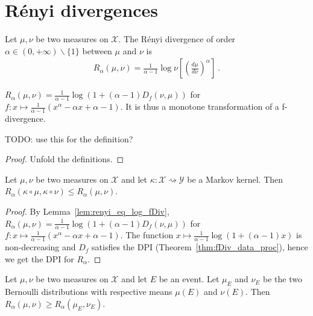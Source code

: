 \chapter{Rényi divergences}

\begin{definition}
  \label{def:Renyi}
  Let $\mu, \nu$ be two measures on $\mathcal X$. The Rényi divergence of order $\alpha \in (0,+\infty) \backslash \{1\}$ between $\mu$ and $\nu$ is
  \begin{align*}
  R_\alpha(\mu, \nu) = \frac{1}{\alpha - 1}\log \nu\left[\left(\frac{d \mu}{d \nu}\right)^\alpha\right] \: .
  \end{align*}
\end{definition}

\begin{lemma}
  \label{lem:renyi_eq_log_fDiv}
  $R_\alpha(\mu, \nu) = \frac{1}{\alpha - 1} \log (1 + (\alpha - 1) D_f(\nu, \mu))$ for $f : x \mapsto \frac{1}{\alpha - 1}(x^{\alpha} - \alpha x + \alpha - 1)$. It is thus a monotone transformation of a f-divergence.

  TODO: use this for the definition?
\end{lemma}

\begin{proof}
Unfold the definitions.
\end{proof}

\begin{theorem}
  \label{thm:renyi_data_proc}
  Let $\mu, \nu$ be two measures on $\mathcal X$ and let $\kappa : \mathcal X \rightsquigarrow \mathcal Y$ be a Markov kernel.
  Then $R_\alpha(\kappa \circ \mu, \kappa \circ \nu) \le R_\alpha(\mu, \nu)$.
\end{theorem}

\begin{proof}
By Lemma~\ref{lem:renyi_eq_log_fDiv}, $R_\alpha(\mu, \nu) = \frac{1}{\alpha - 1} \log (1 + (\alpha - 1) D_f(\nu, \mu))$ for $f : x \mapsto \frac{1}{\alpha - 1}(x^{\alpha} - \alpha x + \alpha - 1)$.
The function $x \mapsto \frac{1}{\alpha - 1}\log (1 + (\alpha - 1)x)$ is non-decreasing and $D_f$ satisfies the DPI (Theorem~\ref{thm:fDiv_data_proc}), hence we get the DPI for $R_\alpha$.
\end{proof}

\begin{lemma}
  \label{lem:renyi_data_proc_event}
  Let $\mu, \nu$ be two measures on $\mathcal X$ and let $E$ be an event. Let $\mu_E$ and $\nu_E$ be the two Bernoulli distributions with respective means $\mu(E)$ and $\nu(E)$.
  Then $R_\alpha(\mu, \nu) \ge R_\alpha(\mu_E, \nu_E)$.
\end{lemma}

